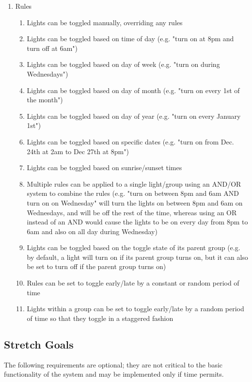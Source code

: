 \documentclass[12pt]{article}
\begin{document}
\begin{enumerate}
    \item Rules
        \begin{enumerate}
            \item Lights can be toggled manually, overriding any rules
            \item Lights can be toggled based on time of day (e.g. "turn on at 8pm and turn off at 6am")
            \item Lights can be toggled based on day of week (e.g. "turn on during Wednesdays")
            \item Lights can be toggled based on day of month (e.g. "turn on every 1st of the month")
            \item Lights can be toggled based on day of year (e.g. "turn on every January 1st")
            \item Lights can be toggled based on specific dates (e.g. "turn on from Dec. 24th at 2am to Dec 27th at 8pm")
            \item Lights can be toggled based on sunrise/sunset times
            \item Multiple rules can be applied to a single light/group using an AND/OR system to combine the rules (e.g. "turn on between 8pm and 6am AND turn on on Wednesday" will turn the lights on between 8pm and 6am on Wednesdays, and will be off the rest of the time, whereas using an OR instead of an AND would cause the lights to be on every day from 8pm to 6am and also on all day during Wednesday)
            \item Lights can be toggled based on the toggle state of its parent group (e.g. by default, a light will turn on if its parent group turns on, but it can also be set to turn off if the parent group turns on)
            \item Rules can be set to toggle early/late by a constant or random period of time
            \item Lights within a group can be set to toggle early/late by a random period of time so that they toggle in a staggered fashion
        \end{enumerate}
\end{enumerate}

\subsection{Stretch Goals}

The following requirements are optional; they are not critical to the basic
functionality of the system and may be implemented only if time permits.
\end{document}
